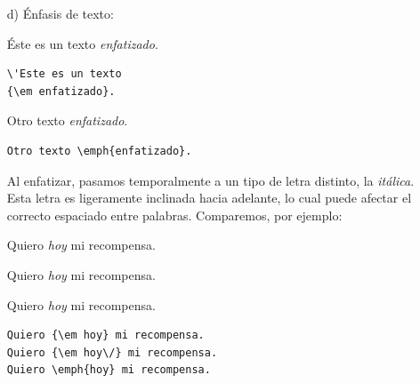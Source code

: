 \begin{enumerate}
Cuando estas excepciones se producen, nosotros, humanos, tenemos que
ayudarle al computador, dici{\'e}ndole que, aunque hay un punto despu{\'e}s de
la ``g'', no hay un fin de frase, y que el punto despu{\'e}s de la {\'u}ltima
``S'' s{\'\i} termina frase. Esto se consigue as{\'\i}:
\begin{verbatim}
En la p\'ag.\ 11 encontraremos noticias desde la 
U.R.S.S\@. \'Estas fueron entregadas...
\end{verbatim}

\item[d)] {\'E}nfasis de texto:

\vspace{.3cm}
{\small
\begin{minipage}{5cm}
{\'E}ste es un texto
{\em enfatizado}.
\end{minipage}
\hspace{1.5cm}
\begin{minipage}[t]{5cm}
\begin{verbatim}
\'Este es un texto
{\em enfatizado}.
\end{verbatim}
\end{minipage}

\vspace{.3cm}
\begin{minipage}{5cm}
Otro texto \emph{enfatizado}.
\end{minipage}
\hspace{1.5cm}
\begin{minipage}[t]{5cm}
\begin{verbatim}
Otro texto \emph{enfatizado}.
\end{verbatim}
\end{minipage}
}
\vspace{.3cm}

Al enfatizar, pasamos temporalmente a un tipo de letra distinto, la
{\em it{\'a}lica}. Esta letra es ligeramente inclinada hacia adelante, lo
cual puede afectar el correcto espaciado entre palabras.  Comparemos,
por ejemplo:

\vspace{.3cm}
{\small
\begin{minipage}[t]{5cm}
Quiero {\em hoy} mi recompensa.

Quiero {\em hoy\/} mi recompensa.

Quiero \emph{hoy} mi recompensa.
\end{minipage}
\hspace{.5cm}
\begin{minipage}[t]{5cm}
\begin{verbatim}
Quiero {\em hoy} mi recompensa.
Quiero {\em hoy\/} mi recompensa.
Quiero \emph{hoy} mi recompensa.
\end{verbatim}
\end{minipage}
}
\vspace{.3cm}



\end{enumerate}
